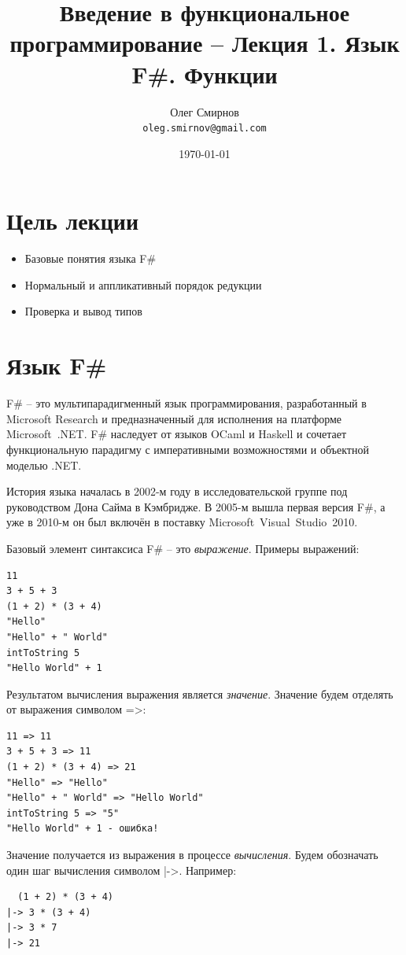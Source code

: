 \documentclass[a4paper,11pt]{article}
\author{Олег Смирнов\\
\texttt{oleg.smirnov@gmail.com}}
\date{\today}
\title{Введение в функциональное программирование -- Лекция 1. Язык F\#. Функции}
\begin{document}
\maketitle
\tableofcontents
\newpage

\section*{Цель лекции}
\begin{itemize}
\item Базовые понятия языка F\#
\item Нормальный и аппликативный порядок редукции
\item Проверка и вывод типов
\end{itemize}

\section{Язык F\#}

F\# -- это мультипарадигменный язык программирования, разработанный в Microsoft
Research и предназначенный для исполнения на платформе Microsoft~.NET. F\#
наследует от языков OCaml и Haskell и сочетает функциональную парадигму с
императивными возможностями и объектной моделью .NET.

История языка началась в 2002-м году в исследовательской группе под руководством
Дона Сайма в Кэмбридже. В 2005-м вышла первая версия F\#, а уже в 2010-м он был
включён в поставку Microsoft~Visual~Studio~2010.

Базовый элемент синтаксиса F\# -- это \emph{выражение}. Примеры выражений:

\begin{lstlisting}
11
3 + 5 + 3
(1 + 2) * (3 + 4)
"Hello"
"Hello" + " World"
intToString 5
"Hello World" + 1
\end{lstlisting}

Результатом вычисления выражения является \emph{значение}. Значение будем
отделять от выражения символом =>:

\begin{lstlisting}
11 => 11
3 + 5 + 3 => 11
(1 + 2) * (3 + 4) => 21
"Hello" => "Hello"
"Hello" + " World" => "Hello World"
intToString 5 => "5"
"Hello World" + 1 - ошибка!
\end{lstlisting}

Значение получается из выражения в процессе \emph{вычисления}. Будем обозначать
один шаг вычисления символом |->. Например:

\begin{lstlisting}
  (1 + 2) * (3 + 4)
|-> 3 * (3 + 4)
|-> 3 * 7
|-> 21
\end{lstlisting}
\end{document}
